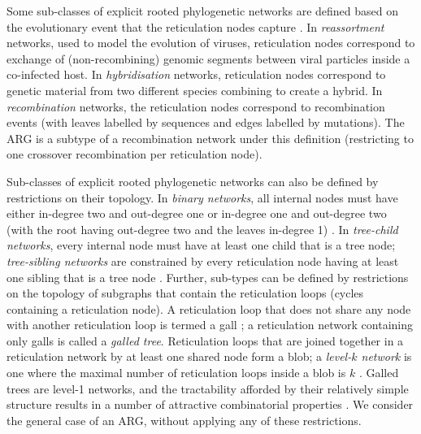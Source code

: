\documentclass{article}
\begin{document}
Some sub-classes of explicit rooted phylogenetic networks are defined based on the evolutionary event that the
reticulation nodes capture \citep{huson2010phylogenetic}. In \emph{reassortment} networks, used to
model the evolution of viruses, reticulation nodes correspond to exchange of
(non-recombining) genomic segments between viral particles inside a co-infected host.
In \emph{hybridisation} networks, reticulation nodes correspond to genetic material from two
different species combining to create a hybrid. In \emph{recombination} networks, the reticulation nodes
correspond to recombination events (with leaves labelled by sequences and edges labelled by mutations).
The ARG is a subtype of a recombination network under this definition (restricting to one crossover
recombination per reticulation node).

Sub-classes of explicit rooted phylogenetic networks can also be defined by restrictions on their topology.
In \emph{binary networks}, all internal nodes must have either in-degree two and out-degree one or in-degree
one and out-degree two (with the root having out-degree two and the leaves in-degree 1) \citep{steel2016phylogeny}.
In \emph{tree-child networks}, every internal node must have at least one child that is a tree node;
\emph{tree-sibling networks} are constrained by every reticulation node having at least one sibling that is a
tree node \citep{cardona2008extended}. Further, sub-types can be defined by restrictions on
the topology of subgraphs that contain the reticulation loops (cycles containing a reticulation node).
A reticulation loop that does not share any node with another reticulation loop is termed a gall
\citep[][p.\ 237]{gusfield2014recombinatorics}; a reticulation network containing only galls is
called a \emph{galled tree}. Reticulation loops that are joined together in a reticulation network
by at least one shared node form a blob; a \emph{level-$k$ network} is one where the maximal number
of reticulation loops inside a blob is $k$ \citep{choy2005computing}. Galled trees are level-1 networks,
and the tractability afforded by their relatively simple structure results in a number of attractive
combinatorial properties \citep{wang2001perfect, gusfield2004optimal}. We consider the general case of
an ARG, without applying any of these restrictions.
\end{document}
